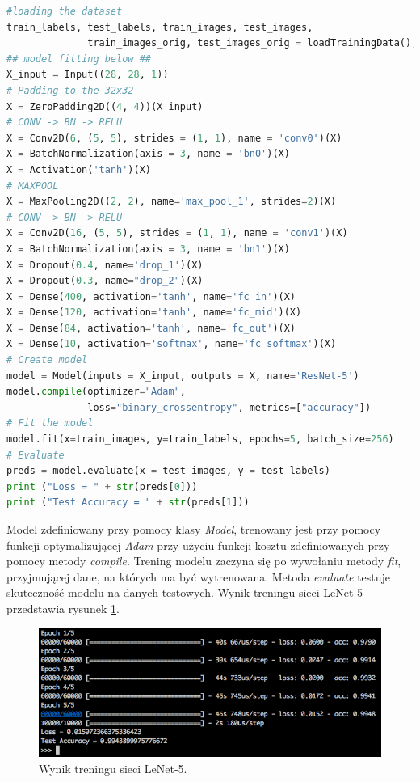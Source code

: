 \label{lst:lenet5keras}
\begin{lstlisting}[language=Python, caption={Model sieci LeNet-5 w Keras.}, captionpos=b]
#loading the dataset
train_labels, test_labels, train_images, test_images, 
              train_images_orig, test_images_orig = loadTrainingData();
## model fitting below ##
X_input = Input((28, 28, 1))
# Padding to the 32x32
X = ZeroPadding2D((4, 4))(X_input)
# CONV -> BN -> RELU
X = Conv2D(6, (5, 5), strides = (1, 1), name = 'conv0')(X)
X = BatchNormalization(axis = 3, name = 'bn0')(X)
X = Activation('tanh')(X)
# MAXPOOL
X = MaxPooling2D((2, 2), name='max_pool_1', strides=2)(X)
# CONV -> BN -> RELU
X = Conv2D(16, (5, 5), strides = (1, 1), name = 'conv1')(X)
X = BatchNormalization(axis = 3, name = 'bn1')(X)
X = Dropout(0.4, name='drop_1')(X)
X = Dropout(0.3, name="drop_2")(X)
X = Dense(400, activation='tanh', name='fc_in')(X)
X = Dense(120, activation='tanh', name='fc_mid')(X)
X = Dense(84, activation='tanh', name='fc_out')(X)
X = Dense(10, activation='softmax', name='fc_softmax')(X)
# Create model
model = Model(inputs = X_input, outputs = X, name='ResNet-5')
model.compile(optimizer="Adam", 
              loss="binary_crossentropy", metrics=["accuracy"])
# Fit the model
model.fit(x=train_images, y=train_labels, epochs=5, batch_size=256)
# Evaluate
preds = model.evaluate(x = test_images, y = test_labels)
print ("Loss = " + str(preds[0]))
print ("Test Accuracy = " + str(preds[1]))
\end{lstlisting}

Model zdefiniowany przy pomocy klasy \textit{Model}, trenowany jest przy pomocy funkcji optymalizującej \textit{Adam} przy użyciu funkcji 
kosztu  zdefiniowanych przy pomocy metody \textit{compile}. Trening modelu zaczyna się po wywołaniu metody \textit{fit}, przyjmującej dane, na których ma być wytrenowana.
Metoda \textit{evaluate} testuje skuteczność modelu na danych testowych. Wynik treningu sieci LeNet-5 przedstawia rysunek \ref{fig:lenet5-training}.

\begin{figure}[ht]
\centerline{\includegraphics[scale=0.5]{resources/training_lenet5.png}}
\caption{Wynik treningu sieci LeNet-5.}
\label{fig:lenet5-training}
\end{figure}

